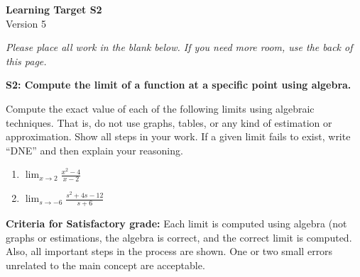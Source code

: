 \documentclass[10pt]{article}
\begin{document}
	\vspace*{0in}

		\begin{center}
			\textbf{Learning Target S2} \\
			{Version 5} %
		\end{center}

\emph{Please place all work in the blank below. If you need more room, use the back of this page.}

\begin{framed}
	\textbf{S2: Compute the limit of a function at a specific point using algebra.}
\end{framed}

Compute the exact value of each of the following limits using algebraic techniques. That is, do not use graphs, tables, or any kind of estimation or approximation. Show all steps in your work. If a given limit fails to exist, write ``DNE'' and then explain your reasoning. 

\begin{enumerate}
    \item $\displaystyle{\lim_{x \to 2} \frac{x^2-4}{x-2}}$
    \item $\displaystyle{\lim_{s \to -6} \frac{s^2 + 4s - 12}{s+6}}$
\end{enumerate}

\vfill


\begin{small}
    \begin{framed}
        	\textbf{Criteria for Satisfactory grade:} Each limit is computed using algebra (not graphs or estimations, the algebra is correct, and the correct limit is computed. Also, all important steps in the process are shown. One or two small errors unrelated to the main concept are acceptable.
    \end{framed}

\end{small}
\end{document}
